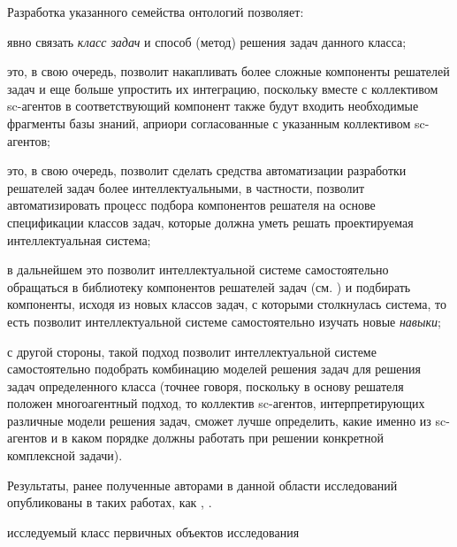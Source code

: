 \begin{SCn}
{    	Разработка указанного семейства онтологий позволяет:
    	\begin{scnitemize}
    		\item явно связать \textit{класс задач} и способ (метод) решения задач данного класса;
    		\item это, в свою очередь, позволит накапливать более сложные компоненты решателей задач и еще больше упростить их интеграцию, поскольку вместе с коллективом sc-агентов в соответствующий компонент также будут входить необходимые фрагменты базы знаний, априори согласованные с указанным коллективом sc-агентов;
    		\item это, в свою очередь, позволит сделать средства автоматизации разработки решателей задач более интеллектуальными, в частности, позволит автоматизировать процесс подбора компонентов решателя на основе спецификации классов задач, которые должна уметь решать проектируемая интеллектуальная система;
    		\item в дальнейшем это позволит интеллектуальной системе самостоятельно обращаться в библиотеку компонентов решателей задач (см. \textit{}) и подбирать компоненты, исходя из новых классов задач, с которыми столкнулась система, то есть позволит интеллектуальной системе самостоятельно изучать новые \textit{навыки};
    		\item с другой стороны, такой подход позволит интеллектуальной системе самостоятельно подобрать комбинацию моделей решения задач для решения задач определенного класса (точнее говоря, поскольку в основу решателя положен многоагентный подход, то коллектив sc-агентов, интерпретирующих различные модели решения задач, сможет лучше определить, какие именно из sc-агентов и в каком порядке должны работать при решении конкретной комплексной задачи).
    	\end{scnitemize}
    	Результаты, ранее полученные авторами в данной области исследований опубликованы в таких работах, как \cite{Shunkevich2022}, \cite{Standart2021}.}
    \begin{scnhaselementrolelist}{исследуемый класс первичных объектов исследования}
        \begin{scnindent}
        \end{scnindent}
        \begin{scnindent}

\end{scnindent}
\end{scnhaselementrolelist}
\end{SCn}
